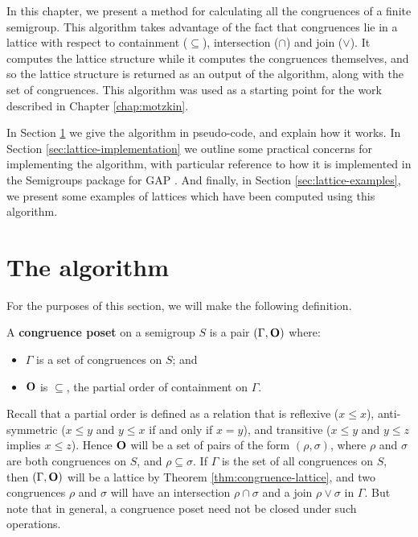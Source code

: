 In this chapter, we present a method for calculating all the congruences of a
finite semigroup.  This algorithm takes advantage of the fact that congruences
lie in a lattice with respect to containment ($\subseteq$), intersection
($\cap$) and join ($\vee$).  It computes the lattice structure while it computes
the congruences themselves, and so the lattice structure is returned as an
output of the algorithm, along with the set of congruences.  This algorithm was
used as a starting point for the work described in Chapter \ref{chap:motzkin}.

In Section \ref{sec:lattice-algorithm} we give the algorithm in pseudo-code, and
explain how it works.  In Section \ref{sec:lattice-implementation} we outline
some practical concerns for implementing the algorithm, with particular
reference to how it is implemented in the Semigroups package \cite{semigroups}
for GAP \cite{gap}.  And finally, in Section \ref{sec:lattice-examples}, we
present some examples of lattices which have been computed using this algorithm.

\section{The algorithm}
\label{sec:lattice-algorithm}

For the purposes of this section, we will make the following definition.

\begin{definition}
  \label{def:congruence-poset}
  A \textbf{congruence poset} on a semigroup $S$ is a pair $(\Gamma, \mathbf{O})$
  where:
  \begin{itemize}
  \item $\Gamma$ is a set of congruences on $S$; and
  \item $\mathbf{O}$ is $\subseteq$, the partial order of containment on $\Gamma$.
  \end{itemize}
\end{definition}

Recall that a partial order is defined as a relation that is reflexive
($x \leq x$), anti-symmetric ($x \leq y$ and $y \leq x$ if and only if $x = y$),
and transitive ($x \leq y$ and $y \leq z$ implies $x \leq z$).
Hence $\mathbf{O}$ will be a set of pairs of the form $(\rho, \sigma)$, where $\rho$
and $\sigma$ are both congruences on $S$, and $\rho \subseteq \sigma$.  If
$\Gamma$ is the set of all congruences on $S$, then $(\Gamma, \mathbf{O})$ will be a
lattice by Theorem \ref{thm:congruence-lattice}, and two congruences $\rho$ and
$\sigma$ will have an intersection $\rho \cap \sigma$ and a join
$\rho \vee \sigma$ in $\Gamma$.  But note that in general, a congruence poset
need not be closed under such operations.

